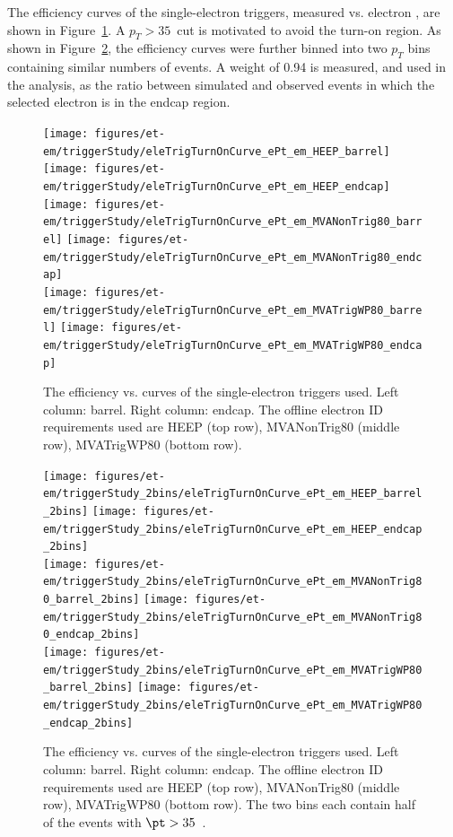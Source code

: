 The efficiency curves of the single-electron triggers, measured
vs. electron \pt, are shown in Figure~\ref{fig:eturnon}. A
$p_{T}>35$~\gev cut is motivated to avoid the turn-on region. As shown
in Figure~\ref{fig:eturnon2}, the efficiency curves were further
binned into two $p_T$ bins containing similar numbers of events.  A
weight of 0.94 is measured, and used in the analysis, as the ratio
between simulated and observed events in which the selected electron
is in the endcap region.
\begin{figure}\centering
  \texttt{[image: figures/et-em/triggerStudy/eleTrigTurnOnCurve\_ePt\_em\_HEEP\_barrel]}
  \texttt{[image: figures/et-em/triggerStudy/eleTrigTurnOnCurve\_ePt\_em\_HEEP\_endcap]} \\
  \texttt{[image: figures/et-em/triggerStudy/eleTrigTurnOnCurve\_ePt\_em\_MVANonTrig80\_barrel]}
  \texttt{[image: figures/et-em/triggerStudy/eleTrigTurnOnCurve\_ePt\_em\_MVANonTrig80\_endcap]} \\
  \texttt{[image: figures/et-em/triggerStudy/eleTrigTurnOnCurve\_ePt\_em\_MVATrigWP80\_barrel]}
  \texttt{[image: figures/et-em/triggerStudy/eleTrigTurnOnCurve\_ePt\_em\_MVATrigWP80\_endcap]}
  \caption{\label{fig:eturnon} The efficiency vs. \pt curves of the
    single-electron triggers used.  Left column: barrel.  Right
    column: endcap.  The offline electron ID requirements used are
    HEEP (top row), MVANonTrig80 (middle row), MVATrigWP80 (bottom
    row).}
\end{figure}
\begin{figure}\centering
  \texttt{[image: figures/et-em/triggerStudy\_2bins/eleTrigTurnOnCurve\_ePt\_em\_HEEP\_barrel\_2bins]}
  \texttt{[image: figures/et-em/triggerStudy\_2bins/eleTrigTurnOnCurve\_ePt\_em\_HEEP\_endcap\_2bins]} \\
  \texttt{[image: figures/et-em/triggerStudy\_2bins/eleTrigTurnOnCurve\_ePt\_em\_MVANonTrig80\_barrel\_2bins]}
  \texttt{[image: figures/et-em/triggerStudy\_2bins/eleTrigTurnOnCurve\_ePt\_em\_MVANonTrig80\_endcap\_2bins]} \\
  \texttt{[image: figures/et-em/triggerStudy\_2bins/eleTrigTurnOnCurve\_ePt\_em\_MVATrigWP80\_barrel\_2bins]}
  \texttt{[image: figures/et-em/triggerStudy\_2bins/eleTrigTurnOnCurve\_ePt\_em\_MVATrigWP80\_endcap\_2bins]}
  \caption{\label{fig:eturnon2} The efficiency vs. \pt curves of the
    single-electron triggers used.  Left column: barrel.  Right
    column: endcap.  The offline electron ID requirements used are
    HEEP (top row), MVANonTrig80 (middle row), MVATrigWP80 (bottom
    row).  The two bins each contain half of the events with
    $\pt>35$~\gev.}
\end{figure}

